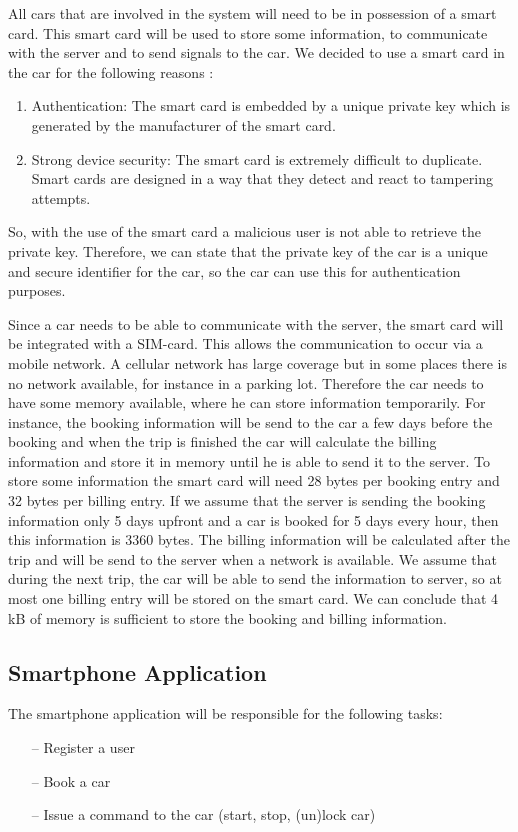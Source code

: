 \documentclass[12pt,a4paper, oneside]{article}
\begin{document}
All cars that are involved in the system will need to be in possession of a smart card. This smart card will be used to store some information, to communicate with the server and to send signals to the car.
We decided to use a smart card in the car for the following reasons \citep{smartcard}:
\begin{enumerate}
\item Authentication: The smart card is embedded by a unique private key which is generated by the manufacturer of the smart card.
\item Strong device security: The smart card is extremely difficult to duplicate. Smart cards are designed in a way that they detect and react to tampering attempts. 
\end{enumerate}
So, with the use of the smart card a malicious user is not able to retrieve the private key. Therefore, we can state that the private key of the car is a unique and secure identifier for the car, so the car can use this for authentication purposes.

Since a car needs to be able to communicate with the server, the smart card will be integrated with a SIM-card. This allows the communication to occur via a mobile network. A cellular network has large coverage but in some places there is no network available, for instance in a parking lot. Therefore the car needs to have some memory available, where he can store information temporarily. For instance, the booking information will be send to the car a few days before the booking and when the trip is finished the car will calculate the billing information and store it in memory until he is able to send it to the server. To store some information the smart card will need 28 bytes per booking entry and 32 bytes per billing entry. If we assume that the server is sending the booking information only 5 days upfront and a car is booked for 5 days every hour, then this information is 3360 bytes. The billing information will be calculated after the trip and will be send to the server when a network is available. We assume that during the next trip, the car will be able to send the information to server, so at most one billing entry will be stored on the smart card. We can conclude that 4 kB of memory is sufficient to store the booking and billing information.

\subsection{Smartphone Application}\label{sec:user}
The smartphone application will be responsible for the following tasks:
\begin{itemize}
\item[--] Register a user
\item[--] Book a car
\item[--] Issue a command to the car (start, stop, (un)lock car)
\end{itemize}
\end{document}
